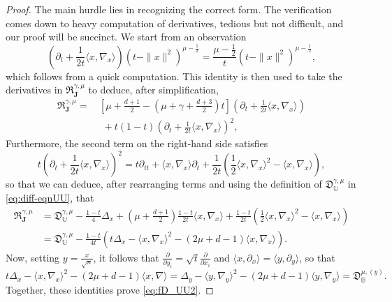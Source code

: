 \documentclass{amsart}
\theoremstyle{remark}
\def\la{{\langle}}
\def\ra{{\rangle}}
\def\fD{{\mathfrak D}}
\def\fR{{\mathfrak R}}
\def\g{{\gamma}}
\def\la{{\langle}}
\def\ra{{\rangle}}
\def\Jb{{\mathbf J}}
\def\BB{{\mathbb B}}
\def\UU{{\mathbb U}}
\def\f{\frac}
\begin{document}
\begin{proof}
The main hurdle lies in recognizing the correct form. The verification comes down to heavy computation of
derivatives, tedious but not difficult, and our proof will be succinct. We start from an observation 
$$
   \left(\partial_t + \frac{1}{2t} \la x,\nabla_x\ra \right) (t-\|x\|^2)^{\mu - \frac12}
    = \frac{\mu - \f12}{t} (t-\|x\|^2)^{\mu-\f12},
$$
which follows from a quick computation. This identity is then used to take the derivatives in $\fR_\Jb^{\g,\mu}$ to
deduce, after simplification, 
\begin{align*}
 \fR_\Jb^{\g,\mu} 
  = \,& \left[ \mu+ \frac {d+1} 2 - \left(\mu+\g+ \frac {d+3} 2 \right)t \right]  \left( \partial_t + \frac{1}{2t} \la x ,\nabla_x\ra \right) \\
    & \,\, + t(1-t)  \left( \partial_t + \frac{1}{2t} \la x ,\nabla_x\ra \right)^2, 
\end{align*}
Furthermore, the second term on the right-hand side satisfies 
\begin{equation*}
   t \left( \partial_t + \frac{1}{2t} \la x ,\nabla_x\ra \right)^2 = t \partial_{tt} + \la x, \nabla_x \ra \partial_t + 
      \frac{1}{2t} \left( \frac 12 \la x, \nabla_x\ra^2 - \la x, \nabla_x\ra \right),
\end{equation*}
so that we can deduce, after rearranging terms and using the definition of $\fD_\UU^{\g,\mu}$ in \eqref{eq:diff-eqnUU}, that 
\begin{align*}
 \fR_\Jb^{\g,\mu}& =  \fD_\UU^{\g,\mu} -\frac{1-t}4 \Delta_x + \left (\mu+\frac{d+1}{2}\right )\frac{1-t}{2t} \la x, \nabla_x \ra
  +   \frac{1-t}{2t} \left( \frac 12 \la x, \nabla_x\ra^2 - \la x, \nabla_x\ra \right)\\
  & =  \fD_\UU^{\g,\mu} - \frac{1-t}{4t} \left(t \Delta_x - \la x, \nabla_x \ra^2 - (2\mu+d-1) \la x, \nabla_x \ra \right).
\end{align*}  
Now, setting $y = \frac{x}{\sqrt{n}}$, it follows that $\frac{\partial}{\partial y_i} = \sqrt{t}  \frac{\partial}{\partial x_i}$
and $\la x, \partial_x\ra = \la y, \partial_y\ra$, so that 
$$
t \Delta_x - \la x, \nabla_x \ra^2 - (2\mu+d-1) \la x, \nabla \ra = \Delta_y - \la y, \nabla_y \ra^2 - (2\mu+d-1) \la y, \nabla_y \ra
 = \fD_\BB^{\mu, (y)}.
$$
Together, these identities prove \eqref{eq:fD_UU2}. 


\end{proof}
\end{document}
